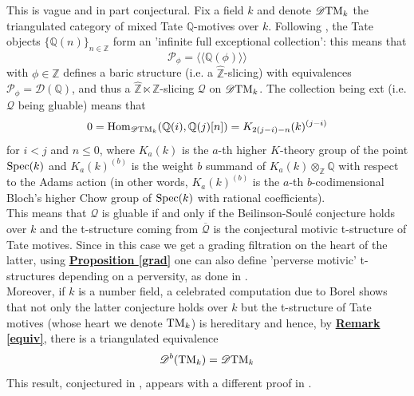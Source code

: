 \begin{exmp}
This is vague and in part conjectural. Fix a field $k$ and denote $\mathscr{D}\textnormal{TM}_k$ the triangulated category of mixed Tate $\mathbb{Q}$-motives over $k$. Following \cite{lev}, the Tate objects $\{ \mathbb{Q}(n) \}_{n \in \mathbb{Z}}$ form an 'infinite full exceptional collection': this means that $$\mathscr{P}_{\phi}=\langle \langle \mathbb{Q}(\phi) \rangle \rangle $$ 
with $\phi \in \mathbb{Z}$ defines a baric structure (i.e. a $\hat{\mathbb{Z}}$-slicing) with equivalences $\mathscr{P}_{\phi} = \mathscr{D}(\mathbb{Q})$, and thus a $\hat{\mathbb{Z}} \ltimes \mathbb{Z}$-slicing $\mathscr{Q}$ on $\mathscr{D}\textnormal{TM}_k$. The collection being ext (i.e. $\mathscr{Q}$ being gluable) means that $$0=\textnormal{Hom}_{\mathscr{D}\textnormal{TM}_k}(\mathbb{Q}(i),\mathbb{Q}(j)[n])=K_{2(j-i)-n}(k)^{(j-i)}$$
for $i<j$ and $n \le 0$, where $K_a(k)$ is the $a$-th higher $K$-theory group of the point $\textnormal{Spec}(k)$ and $K_a(k)^{(b)}$ is the weight $b$ summand of $K_a(k) \otimes_{\mathbb{Z}} \mathbb{Q}$ with respect to the Adams action (in other words, $K_a(k)^{(b)}$ is the $a$-th $b$-codimensional Bloch's higher Chow group of $\textnormal{Spec}(k)$ with rational coefficients). \\
This means that $\mathscr{Q}$ is gluable if and only if the Beilinson-Soul\'e conjecture holds over $k$ and the t-structure coming from $\overline{\mathscr{Q}}$ is the conjectural motivic t-structure of Tate motives. Since in this case we get a grading filtration on the heart of the latter, using \hyperref[grad]{\textbf{Proposition \ref*{grad}}} one can also define 'perverse motivic' t-structures depending on a perversity, as done in \cite{soer2}. \\
Moreover, if $k$ is a number field, a celebrated computation due to Borel shows that not only the latter conjecture holds over $k$ but the t-structure of Tate motives (whose heart we denote $\textnormal{TM}_k$) is hereditary and hence, by  \hyperref[equiv]{\textbf{Remark \ref*{equiv}}}, there is a triangulated equivalence $$\mathscr{D}^b(\textnormal{TM}_k)=\mathscr{D}\textnormal{TM}_k$$
This result, conjectured in \cite{lev}, appears with a different proof in \cite{wild}. 
\end{exmp}

